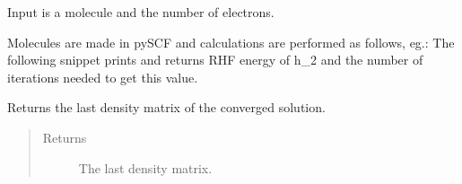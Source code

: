 \documentclass[letterpaper,10pt,english]{sphinxmanual}
\begin{document}
\begin{fulllineitems}
\label{\detokenize{RHF:ghf.RHF.RHF}}
Input is a molecule and the number of electrons.

Molecules are made in pySCF and calculations are performed as follows, eg.:
The following snippet prints and returns RHF energy of h\_2
and the number of iterations needed to get this value.

\begin{sphinxVerbatim}[commandchars=\\\{\}]
          
   
\end{sphinxVerbatim}

\begin{fulllineitems}
\label{\detokenize{RHF:ghf.RHF.RHF.get_last_dens}}
Returns the last density matrix of the converged solution.
\begin{quote}\begin{description}
\item[{Returns}] \leavevmode
The last density matrix.

\end{description}\end{quote}

\end{fulllineitems}



\end{fulllineitems}
\end{document}
